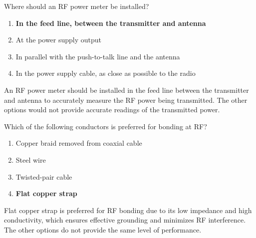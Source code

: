 \begin{tcolorbox}[colback=gray!10!white,colframe=black!75!black,title={T4A05}]
    Where should an RF power meter be installed?
    \begin{enumerate}[label=\Alph*),noitemsep]
        \item \textbf{In the feed line, between the transmitter and antenna}
        \item At the power supply output
        \item In parallel with the push-to-talk line and the antenna
        \item In the power supply cable, as close as possible to the radio
    \end{enumerate}
\end{tcolorbox}
An RF power meter should be installed in the feed line between the transmitter and antenna to accurately measure the RF power being transmitted. The other options would not provide accurate readings of the transmitted power.


\begin{tcolorbox}[colback=gray!10!white,colframe=black!75!black,title={T4A08}]
    Which of the following conductors is preferred for bonding at RF?
    \begin{enumerate}[label=\Alph*),noitemsep]
        \item Copper braid removed from coaxial cable
        \item Steel wire
        \item Twisted-pair cable
        \item \textbf{Flat copper strap}
    \end{enumerate}
\end{tcolorbox}
Flat copper strap is preferred for RF bonding due to its low impedance and high conductivity, which ensures effective grounding and minimizes RF interference. The other options do not provide the same level of performance.


